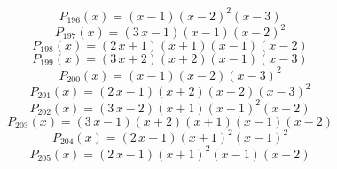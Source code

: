 \subitem \begin{dmath*}P_{196}(x) = {\left(x - 1\right)} {\left(x - 2\right)}^{2} {\left(x - 3\right)} \end{dmath*}\vspace{-1.2cm}
\subitem \begin{dmath*}P_{197}(x) = {\left(3 \, x - 1\right)} {\left(x - 1\right)} {\left(x - 2\right)}^{2} \end{dmath*}\vspace{-1.2cm}
\subitem \begin{dmath*}P_{198}(x) = {\left(2 \, x + 1\right)} {\left(x + 1\right)} {\left(x - 1\right)} {\left(x - 2\right)} \end{dmath*}\vspace{-1.2cm}
\subitem \begin{dmath*}P_{199}(x) = {\left(3 \, x + 2\right)} {\left(x + 2\right)} {\left(x - 1\right)} {\left(x - 3\right)} \end{dmath*}\vspace{-1.2cm}
\subitem \begin{dmath*}P_{200}(x) = {\left(x - 1\right)} {\left(x - 2\right)} {\left(x - 3\right)}^{2} \end{dmath*}\vspace{-1.2cm}
\subitem \begin{dmath*}P_{201}(x) = {\left(2 \, x - 1\right)} {\left(x + 2\right)} {\left(x - 2\right)} {\left(x - 3\right)}^{2} \end{dmath*}\vspace{-1.2cm}
\subitem \begin{dmath*}P_{202}(x) = {\left(3 \, x - 2\right)} {\left(x + 1\right)} {\left(x - 1\right)}^{2} {\left(x - 2\right)} \end{dmath*}\vspace{-1.2cm}
\subitem \begin{dmath*}P_{203}(x) = {\left(3 \, x - 1\right)} {\left(x + 2\right)} {\left(x + 1\right)} {\left(x - 1\right)} {\left(x - 2\right)} \end{dmath*}\vspace{-1.2cm}
\subitem \begin{dmath*}P_{204}(x) = {\left(2 \, x - 1\right)} {\left(x + 1\right)}^{2} {\left(x - 1\right)}^{2} \end{dmath*}\vspace{-1.2cm}
\subitem \begin{dmath*}P_{205}(x) = {\left(2 \, x - 1\right)} {\left(x + 1\right)}^{2} {\left(x - 1\right)} {\left(x - 2\right)} \end{dmath*}\vspace{-1.2cm}
